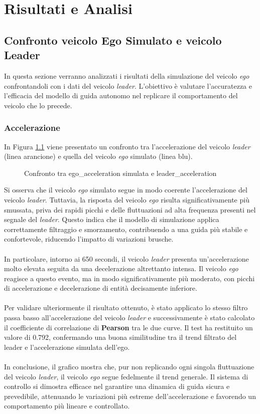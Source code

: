 \chapter{Risultati e Analisi}
\label{cha:risultati}
\section{Confronto veicolo Ego Simulato e veicolo Leader}
In questa sezione verranno analizzati i risultati della simulazione del veicolo \emph{ego} confrontandoli 
con i dati del veicolo \emph{leader}. L'obiettivo è valutare l'accuratezza e l'efficacia del modello di guida autonomo nel replicare 
il comportamento del veicolo che lo precede.
\subsection{Accelerazione}
In Figura \ref{fig:acc_leader_ego} viene presentato un confronto tra l'accelerazione del veicolo \emph{leader} 
(linea arancione) e quella del veicolo \emph{ego} simulato (linea blu).
\begin{figure}[H]
    \centering
    \caption{Confronto tra ego\_acceleration simulata e leader\_acceleration}
    \label{fig:acc_leader_ego}
\end{figure}
\noindent Si osserva che il veicolo \emph{ego} simulato segue in modo coerente l'accelerazione del veicolo \emph{leader}. Tuttavia, la 
risposta del veicolo \emph{ego} risulta significativamente più smussata, priva dei rapidi picchi e delle fluttuazioni ad alta frequenza 
presenti nel segnale del \emph{leader}. Questo indica che il modello di simulazione applica correttamente filtraggio e smorzamento, 
contribuendo a una guida più stabile e confortevole, riducendo l'impatto di variazioni brusche.
\\\\
\noindent In particolare, intorno ai 650 secondi, il veicolo \emph{leader} presenta un'accelerazione molto elevata seguita da una decelerazione 
altrettanto intensa. Il veicolo \emph{ego} reagisce a questo evento, ma in modo significativamente più moderato, con picchi di accelerazione 
e decelerazione di entità decisamente inferiore.
\\\\
\noindent Per validare ulteriormente il risultato ottenuto, è stato applicato lo stesso filtro passa basso all'accelerazione del veicolo 
\emph{leader} e successivamente è stato calcolato il coefficiente di correlazione di \textbf{Pearson} tra le due curve. Il test ha restituito un 
valore di 0.792, confermando una buona similitudine tra il trend filtrato del leader e l'accelerazione simulata dell'ego.
\\\\
\noindent In conclusione, il grafico mostra che, pur non replicando ogni singola fluttuazione del veicolo \emph{leader}, 
il veicolo \emph{ego} segue fedelmente il trend generale. Il sistema di controllo si dimostra efficace nel garantire 
una dinamica di guida sicura e prevedibile, attenuando le variazioni più estreme dell'accelerazione e favorendo 
un comportamento più lineare e controllato.

